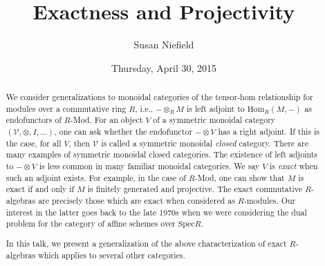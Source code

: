 \documentclass{UAmathtalk}
\author{Susan Niefield}
\title{Exactness and Projectivity}
\date{Thursday, April 30, 2015}
\begin{document}
\maketitle

\begin{abstract}
We consider generalizations to monoidal categories of the tensor-hom relationship for modules over a commutative ring $R$, i.e., $-\otimes_R M$ is left adjoint to $\mathrm{Hom}_R(M,-)$ as endofunctors of $R$-Mod. For an object $V$ of a symmetric monoidal category $(\mathcal{V},\otimes,I,\dots)$, one can ask whether the endofunctor $-\otimes V$ has a right adjoint. If this is the case, for all $V$, then $\mathcal{V}$ is called a symmetric monoidal \emph{closed} category. There are many examples of symmetric monoidal closed categories. The existence of left adjoints to $-\otimes V$ is less common in many familiar monoidal categories. We say $V$ is \emph{exact} when such an adjoint exists.
For example, in the case of $R$-Mod, one can show that $M$ is exact if and only if $M$ is finitely generated and projective. The exact commutative $R$-algebras are precisely those which are exact when considered as $R$-modules. Our interest in the latter goes back to the late 1970s when we  were considering  the dual problem for the category of affine schemes over $\mathrm{Spec}R$. 

In this talk, we present a generalization of the above characterization of exact $R$-algebras which applies to several other categories. 
\end{abstract}
\end{document}
